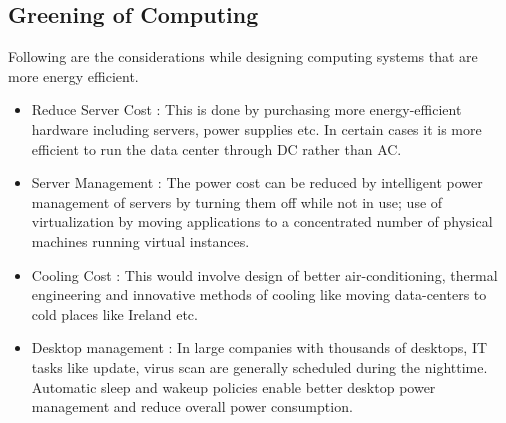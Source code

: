 \documentclass[twoside]{article}
\begin{document}
\subsection{Greening of Computing}
Following are the considerations while designing computing systems that are more energy efficient.
\begin{itemize}
    \item Reduce Server Cost : This is done by purchasing more energy-efficient hardware including servers, power supplies etc. In certain cases it is more efficient to run the data center through DC rather than AC.
    \item Server Management : The power cost can be reduced by intelligent power management of servers by turning them off while not in use; use of virtualization by moving applications to a concentrated number of physical machines running virtual instances. 
    \item Cooling Cost : This would involve design of better air-conditioning, thermal engineering and innovative methods of cooling like moving data-centers to cold places like Ireland etc.
    \item Desktop management : In large companies with thousands of desktops, IT tasks like update, virus scan are generally scheduled during the nighttime. Automatic sleep and wakeup policies enable better desktop power management and reduce overall power consumption.
\end{itemize}
\end{document}

